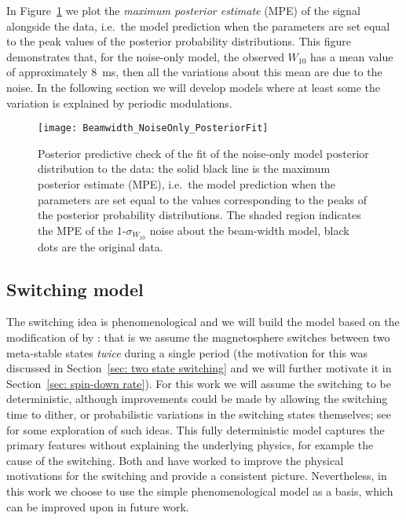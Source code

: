 \documentclass[../full_thesis/full_thesis.tex]{subfiles}
\begin{document}
In Figure~\ref{fig: noise-only beam-width posterior fit} we plot the
\emph{maximum posterior estimate} (MPE) of the signal alongside the data, i.e.\
the model prediction when the parameters are set equal to the peak values of
the posterior probability distributions.  This figure demonstrates that, for
the noise-only model, the observed $W_{10}$ has a mean value of approximately
$8$~ms, then all the variations about this mean are due to the noise. In the
following section we will develop models where at least some the variation is
explained by periodic modulations.
\begin{figure}[htb]
\centering
\texttt{[image: Beamwidth\_NoiseOnly\_PosteriorFit]}
\caption{Posterior predictive check of the fit of the noise-only model
posterior distribution to the data: the solid black line is the maximum
posterior estimate (MPE), i.e.\ the model prediction when the parameters are set
equal to the values corresponding to the peaks of the posterior probability
distributions.   The shaded region indicates the MPE of the 1-$\sigma_{W_{10}}$
noise about the beam-width model, black dots are the original data.}
\label{fig: noise-only beam-width posterior fit}
\end{figure}

\subsection{Switching model}
\label{sec: switching}

The switching idea is phenomenological and we will build the model based on the
modification of \citet{Lyne2010} by \citet{Perera2015}: that is we assume the
magnetosphere switches between two meta-stable states \emph{twice} during a
single period (the motivation for this was discussed in Section~\ref{sec: two state switching}
and we will further motivate it in Section~\ref{sec: spin-down
rate}). For this work we will assume the switching to be deterministic,
although improvements could be made by allowing the switching time to dither,
or probabilistic variations in the switching states themselves; see
\citet{Lyne2010} for some exploration of such ideas. This fully deterministic
model captures the primary features without explaining the underlying physics,
for example the cause of the switching.  Both \citet{Jones2012} and
\citet{Cordes2013} have worked to improve the physical motivations for the
switching and provide a consistent picture. Nevertheless, in this work we
choose to use the simple phenomenological model as a basis, which can be
improved upon in future work.
\end{document}
